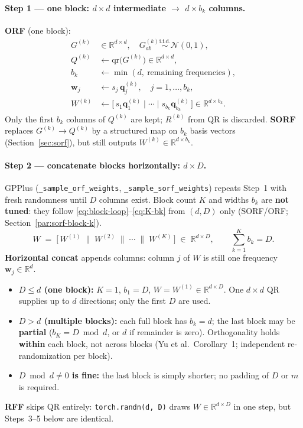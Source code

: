 \documentclass[11pt]{article}
\begin{document}
\paragraph{Step 1 --- one block: $d\times d$ intermediate $\to$ $d\times b_k$ columns.}
\textbf{ORF} (one block):
\begin{align}
  G^{(k)} &\in \mathbb{R}^{d\times d},\quad G^{(k)}_{ab}\stackrel{\text{i.i.d.}}{\sim}\mathcal N(0,1), \\
  Q^{(k)} &\leftarrow \mathrm{qr}\bigl(G^{(k)}\bigr) \in \mathbb{R}^{d\times d}, \\
  b_k &\leftarrow \min(d,\ \text{remaining frequencies}), \\
  \mathbf w_j &\leftarrow s_j\,\mathbf q^{(k)}_{j}, \quad j=1,\ldots,b_k, \\
  W^{(k)} &\leftarrow \bigl[\,s_1\mathbf q^{(k)}_1 \;\big|\; \cdots \;\big|\; s_{b_k}\mathbf q^{(k)}_{b_k}\,\bigr]
  \in \mathbb{R}^{d\times b_k}.
\end{align}
Only the first $b_k$ columns of $Q^{(k)}$ are kept; $R^{(k)}$ from QR is discarded.
\textbf{SORF} replaces $G^{(k)}\!\to\!Q^{(k)}$ by a structured map on $b_k$ basis vectors
(Section~\ref{sec:sorf}), but still outputs $W^{(k)}\in\mathbb{R}^{d\times b_k}$.

\paragraph{Step 2 --- concatenate blocks horizontally: $d\times D$.}
GPPlus (\texttt{\_sample\_orf\_weights}, \texttt{\_sample\_sorf\_weights}) repeats Step~1 with fresh randomness until $D$ columns exist.
Block count $K$ and widths $b_k$ are \textbf{not tuned}: they follow \eqref{eq:block-loop}--\eqref{eq:K-bk} from $(d,D)$ only
(SORF/ORF; Section~\ref{par:sorf-block-k}).
\begin{equation}
  \label{eq:W-concat}
  \boxed{
  W
  \;=\;
  \bigl[\, W^{(1)} \;\|\; W^{(2)} \;\|\; \cdots \;\|\; W^{(K)} \,\bigr]
  \;\in\; \mathbb{R}^{d \times D},
  \qquad
  \sum_{k=1}^{K} b_k = D.
  }
\end{equation}
\textbf{Horizontal concat} appends columns: column $j$ of $W$ is still one frequency $\mathbf w_j\in\mathbb{R}^d$.
\begin{itemize}[nosep]
  \item \textbf{$D \le d$ (one block):} $K=1$, $b_1=D$, $W=W^{(1)}\in\mathbb{R}^{d\times D}$.
        One $d\times d$ QR supplies up to $d$ directions; only the first $D$ are used.
  \item \textbf{$D > d$ (multiple blocks):} each full block has $b_k=d$; the last block may be \textbf{partial}
        ($b_K = D \bmod d$, or $d$ if remainder is zero). Orthogonality holds \textbf{within} each block, not across blocks
        (Yu et al.\ Corollary~1; independent re-randomization per block).
  \item \textbf{$D \bmod d \neq 0$ is fine:} the last block is simply shorter; no padding of $D$ or $m$ is required.
\end{itemize}
\textbf{RFF} skips QR entirely: \texttt{torch.randn(d, D)} draws $W\in\mathbb{R}^{d\times D}$ in one step, but
Steps~3--5 below are identical.
\end{document}
